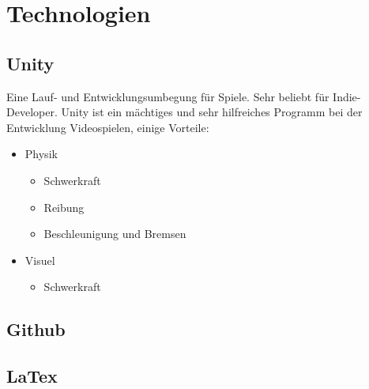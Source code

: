 \chapter{Technologien}

\section{Unity}
Eine Lauf- und Entwicklungsumbegung für Spiele.
Sehr beliebt für Indie-Developer.
Unity ist ein mächtiges und sehr hilfreiches Programm bei der Entwicklung Videospielen, einige Vorteile:
\begin{itemize}
    \item Physik
    \begin{itemize}
        \item Schwerkraft
        \item Reibung
        \item Beschleunigung und Bremsen
    \end{itemize}
    \item Visuel
    \begin{itemize}
        \item Schwerkraft
    \end{itemize}
\end{itemize}

\section{Github}


\section{LaTex}

